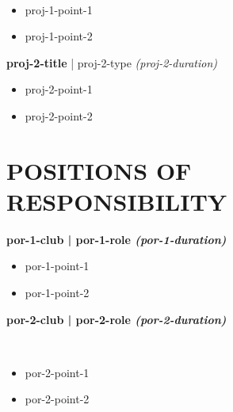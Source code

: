 \documentclass[11pt,usenames,dvipsnames]{article}
\newcommand{\xfilll}[2][1ex]{\hfill}
\begin{document}
{\\
\vspace{-3pt}
\begin{itemize}[label=\textcolor{myblue}{\textbullet},itemsep = -1.15 mm, leftmargin=6mm]
\item {{{proj-1-point-1}}}
\item {{{proj-1-point-2}}}
\end{itemize}

\textbf{ {{{proj-2-title}}} } | {{{proj-2-type}}} \hfill{\em({{{proj-2-duration}}})}\\
\vspace{-3pt}
\begin{itemize}[label=\textcolor{myblue}{\textbullet},itemsep = -1.15 mm, leftmargin=6mm]
\item {{{proj-2-point-1}}}
\item {{{proj-2-point-2}}}
\end{itemize}

\vspace{-3pt}

 
\section*{\large \textrm{\textbf{\color{myblue}POSITIONS OF RESPONSIBILITY\xfilll[0pt]{0.5pt}}}}
\vspace{-3pt}
{\flushleft \bf \large {{{por-1-club}}} | {{{por-1-role}}} \hfill{{{\em({{{por-1-duration}}})}}}\\
\vspace{-3pt}
\begin{itemize}[label=\textcolor{myblue}{\textbullet},itemsep = -1.15 mm, leftmargin=6mm]
\item {{{por-1-point-1}}}
\item {{{por-1-point-2}}}

\end{itemize}
\vspace{-3pt}

{\flushleft\bf\large\textbf{ {{{por-2-club}}} } | {{{por-2-role}}} \hfill{\em({{{por-2-duration}}})}}}\\

\vspace{-3pt}
\begin{itemize}[label=\textcolor{myblue}{\textbullet},itemsep = -1.15 mm, leftmargin=6mm]
\item {{{por-2-point-1}}}
\item {{{por-2-point-2}}}
\end{itemize}


}
\end{document}
